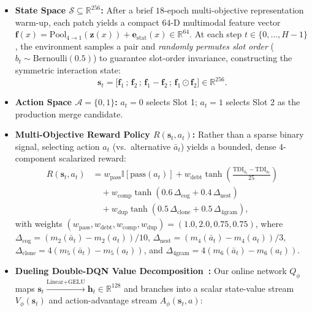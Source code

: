 \documentclass[conference]{IEEEtran}
\begin{document}
\begin{itemize}
    \item \textbf{State Space $\mathcal{S} \subseteq \mathbb{R}^{256}$:} After a brief $18$-epoch multi-objective representation warm-up, each patch yields a compact $64\text{-D}$ multimodal feature vector $\mathbf{f}(x) = \text{Pool}_{4\to 1}(\mathbf{z}(x)) + \mathbf{e}_{\text{stat}}(x) \in \mathbb{R}^{64}$. At each step $t \in \{0,\dots,H-1\}$, the environment samples a pair and \emph{randomly permutes slot order} ($b_t \sim \text{Bernoulli}(0.5)$) to guarantee slot-order invariance, constructing the symmetric interaction state:
    \begin{equation}
        \mathbf{s}_t = \big[\mathbf{f}_1 \,;\, \mathbf{f}_2 \,;\, \mathbf{f}_1 - \mathbf{f}_2 \,;\, \mathbf{f}_1 \odot \mathbf{f}_2\big] \in \mathbb{R}^{256}.
    \end{equation}
    \item \textbf{Action Space $\mathcal{A} = \{0, 1\}$:} $a_t = 0$ selects Slot 1; $a_t = 1$ selects Slot 2 as the production merge candidate.
    \item \textbf{Multi-Objective Reward Policy $R(\mathbf{s}_t, a_t)$:} Rather than a sparse binary signal, selecting action $a_t$ (vs.\ alternative $\bar{a}_t$) yields a bounded, dense $4$-component scalarized reward:
    \begin{align}
        R(\mathbf{s}_t, a_t) &= w_{\text{pass}}\mathbb{I}[\text{pass}(a_t)] + w_{\text{debt}}\tanh\!\left(\frac{\text{TDI}_{\bar{a}_t} - \text{TDI}_{a_t}}{25}\right) \nonumber\\
        &\quad + w_{\text{comp}}\tanh\!\left(0.6\,\Delta_{\text{cog}} + 0.4\,\Delta_{\text{nest}}\right) \nonumber\\
        &\quad + w_{\text{dup}}\tanh\!\left(0.5\,\Delta_{\text{clone}} + 0.5\,\Delta_{\text{4gram}}\right),
        \label{eq:reward}
    \end{align}
    with weights $(w_{\text{pass}}, w_{\text{debt}}, w_{\text{comp}}, w_{\text{dup}}) = (1.0, 2.0, 0.75, 0.75)$, where $\Delta_{\text{cog}} = (m_2(\bar{a}_t)-m_2(a_t))/10$, $\Delta_{\text{nest}} = (m_4(\bar{a}_t)-m_4(a_t))/3$, $\Delta_{\text{clone}} = 4(m_5(\bar{a}_t)-m_5(a_t))$, and $\Delta_{\text{4gram}} = 4(m_6(\bar{a}_t)-m_6(a_t))$.
    \item \textbf{Dueling Double-DQN Value Decomposition~\cite{vanhasselt2016ddqn, wang2016dueling}:} Our online network $Q_\phi$ maps $\mathbf{s}_t \xrightarrow{\text{Linear+GELU}} \mathbf{h}_t \in \mathbb{R}^{128}$ and branches into a scalar state-value stream $V_\phi(\mathbf{s}_t)$ and action-advantage stream $A_\phi(\mathbf{s}_t, a)$:

\end{itemize}
\end{document}
